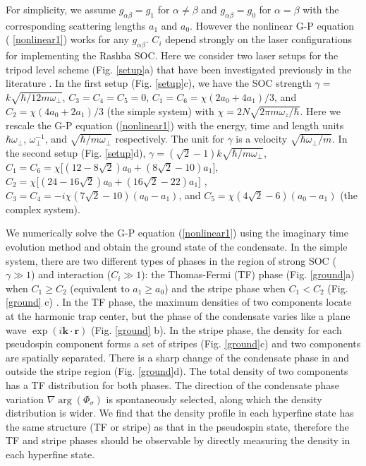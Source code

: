\documentclass[prl,twocolumn,showpacs,floatfix]{revtex4}
\begin{document}
For simplicity, we assume $g_{\alpha \beta }=g_{1}$ for $\alpha \neq \beta $
and $g_{\alpha \beta }=g_{0}$ for $\alpha =\beta $ with the corresponding
scattering lengths $a_{1}$ and $a_{0}$. However the nonlinear G-P equation (%
\ref{nonlinear1}) works for any $g_{\alpha \beta }$. $C_{i}$ depend strongly
on the laser configurations for implementing the Rashba SOC. Here we
consider two laser setups for the tripod level scheme (Fig. \ref{setup}a)
that have been investigated previously in the literature \cite%
{Juzeliunas,Zhang,note1}. In the first setup (Fig. \ref{setup}c), we have
the SOC strength $\gamma =$ $k\sqrt{\hbar /12m\omega _{\perp }}$, $%
C_{3}=C_{4}=C_{5}=0$, $C_{1}=C_{6}=\chi (2a_{0}+4a_{1})/3$, and $C_{2}=\chi
(4a_{0}+2a_{1})/3$ (the simple system) with $\chi =2N\sqrt{2\pi m\omega
_{z}/\hbar }$. Here we rescale the G-P equation (\ref{nonlinear1}) with the
energy, time and length units $\hbar \omega _{\perp }$, $\omega _{\perp
}^{-1}$, and $\sqrt{\hbar /m\omega _{\perp }}$ respectively. The unit for $%
\gamma $ is a velocity $\sqrt{\hbar \omega _{\perp }/m}$. In the second
setup (Fig. \ref{setup}d), $\gamma =(\sqrt{2}-1)k\sqrt{\hbar /m\omega
_{\perp }}$, $C_{1}=C_{6}=\chi \lbrack (12-8\sqrt{2})a_{0}+(8\sqrt{2}%
-10)a_{1}]$, $C_{2}=\chi \lbrack (24-16\sqrt{2})a_{0}+(16\sqrt{2}-22)a_{1}]$%
, $C_{3}=C_{4}=-i\chi (7\sqrt{2}-10)(a_{0}-a_{1})$, and $C_{5}=\chi (4\sqrt{2%
}-6)(a_{0}-a_{1})$ (the complex system).

We numerically solve the G-P equation (\ref{nonlinear1}) using the imaginary
time evolution method and obtain the ground state of the condensate. In the
simple system, there are two different types of phases in the region of
strong SOC ($\gamma \gg 1$) and interaction ($C_{i}\gg 1$): the Thomas-Fermi
(TF) phase (Fig. \ref{ground}a) when $C_{1}\geq C_{2}$ (equivalent to $%
a_{1}\geq a_{0}$) and the stripe phase when $C_{1}<C_{2}$ (Fig. \ref{ground}%
c) \cite{Wang}. In the TF phase, the maximum densities of two components
locate at the harmonic trap center, but the phase of the condensate varies
like a plane wave $\exp \left( i\mathbf{k\cdot r}\right) $ (Fig. \ref{ground}%
b). In the stripe phase, the density for each pseudospin component forms a
set of stripes (Fig. \ref{ground}c) and two components are spatially
separated. There is a sharp change of the condensate phase in and outside
the stripe region (Fig. \ref{ground}d). The total density of two components
has a TF distribution for both phases. The direction of the condensate phase
variation $\nabla \arg \left( \Phi _{\sigma }\right) $ is spontaneously
selected, along which the density distribution is wider. We find that the
density profile in each hyperfine state has the same structure (TF or
stripe) as that in the pseudospin state, therefore the TF and stripe phases
should be observable by directly measuring the density in each hyperfine
state.
\end{document}
